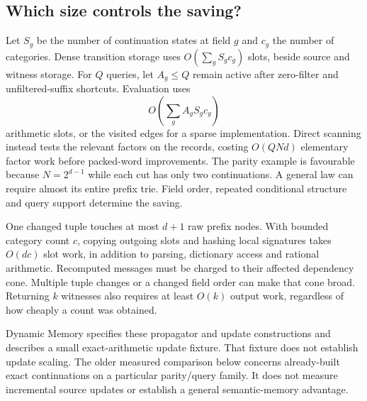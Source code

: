 \subsection{Which size controls the saving?}

Let $S_g$ be the number of continuation states at field $g$ and $c_g$ the number of categories. Dense transition storage uses $O(\sum_gS_gc_g)$ slots, beside source and witness storage. For $Q$ queries, let $A_g\leq Q$ remain active after zero-filter and unfiltered-suffix shortcuts. Evaluation uses
\begin{equation}
 O\!\left(\sum_g A_gS_gc_g\right)
 \label{eq:dynamic-query-cost}
\end{equation}
arithmetic slots, or the visited edges for a sparse implementation. Direct scanning instead tests the relevant factors on the records, costing $O(QNd)$ elementary factor work before packed-word improvements. The parity example is favourable because $N=2^{d-1}$ while each cut has only two continuations. A general law can require almost its entire prefix trie. Field order, repeated conditional structure and query support determine the saving.

One changed tuple touches at most $d+1$ raw prefix nodes. With bounded category count $c$, copying outgoing slots and hashing local signatures takes $O(dc)$ slot work, in addition to parsing, dictionary access and rational arithmetic. Recomputed messages must be charged to their affected dependency cone. Multiple tuple changes or a changed field order can make that cone broad. Returning $k$ witnesses also requires at least $O(k)$ output work, regardless of how cheaply a count was obtained.

Dynamic Memory specifies these propagator and update constructions and describes a small exact-arithmetic update fixture. That fixture does not establish update scaling. The older measured comparison below concerns already-built exact continuations on a particular parity/query family. It does not measure incremental source updates or establish a general semantic-memory advantage.

